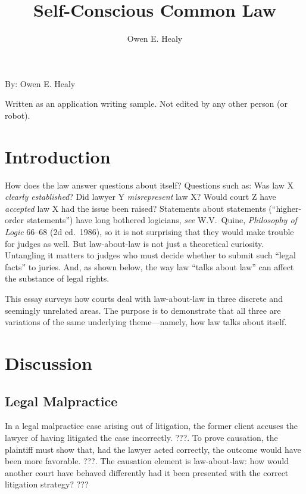 \documentclass[
  12pt,
  letterpaper,
]{scrartcl}
\title{Self-Conscious Common Law}
\author{Owen E. Healy}
\begin{document}
\begin{center}\end{center}
  
\vspace{10pt}\noindent\begin{minipage}{4in}
  \setlength{\parskip}{6pt}
  
  \noindent By: Owen E. Healy

  \noindent Written as an application writing sample. Not edited by any other person (or robot).
\end{minipage}


\vspace{12pt}\section{Introduction}

How does the law answer questions about itself? Questions such as: Was law X
\emph{clearly established}? Did lawyer Y \emph{misrepresent} law X? Would court
Z have \emph{accepted} law X had the issue been raised? Statements about
statements (``higher-order statements'') have long bothered logicians,
\textit{see} W.V.~Quine, \textit{Philosophy of Logic} 66--68 (2d ed.~1986), so
it is not surprising that they would make trouble for judges as well. But
law-about-law is not just a theoretical curiosity. Untangling it matters to
judges who must decide whether to submit such ``legal facts'' to juries. And,
as shown below, the way law ``talks about law'' can affect the substance of
legal rights.

This essay surveys how courts deal with law-about-law in three discrete and
seemingly unrelated areas. The purpose is to demonstrate that all three are
variations of the same underlying theme---namely, how law talks about itself.


\section{Discussion}


\subsection{Legal Malpractice}

In a legal malpractice case arising out of litigation, the former client
accuses the lawyer of having litigated the case incorrectly. ???. To prove
causation, the plaintiff must show that, had the lawyer acted correctly, the
outcome would have been more favorable. ???. The causation element is
law-about-law: how would another court have behaved differently had it been
presented with the correct litigation strategy? ???
\end{document}
